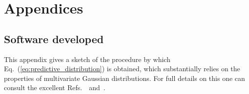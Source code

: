 
\setcounter{chapter}{-1}
\chapter{Appendices} \label{appendix}
\renewcommand{\thechapter}{A}


\section{Software developed}
\label{sec:Appendix}

This appendix gives a sketch of the procedure by which Eq.~(\ref{eq:predictive_distribution}) is obtained, which substantially relies on the properties of multivariate Gaussian distributions. For full details on this one can consult the excellent Refs.~\citep{--}~and~\citep{--}.
%

